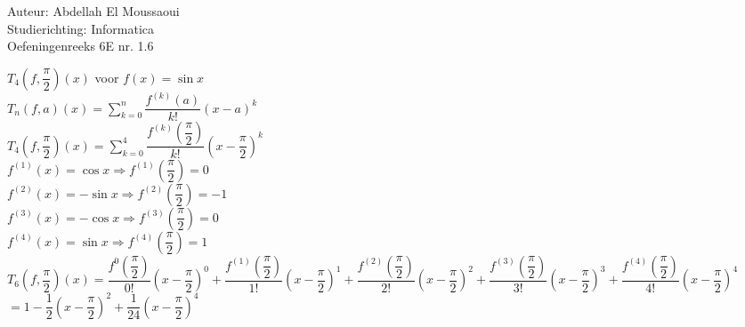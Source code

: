 \documentclass[a4paper]{article}
\begin{document}
  
\noindent \large Auteur: Abdellah El Moussaoui \\
\noindent \large Studierichting: Informatica\\
\noindent \large Oefeningenreeks 6E nr. 1.6\\

\medskip

\normalsize


$T_4\left(f,\dfrac{\pi}{2}\right)(x)$ voor $f(x) = \sin{x}$ \\

$T_n(f,a)(x) = \displaystyle\sum_{k = 0}^{n} \dfrac{f^{(k)}(a)}{k!}(x - a)^k$ \\

$T_4\left(f,\dfrac{\pi}{2}\right)(x) = \displaystyle\sum_{k = 0}^{4} \dfrac{f^{(k)}\left(\dfrac{\pi}{2}\right)}{k!}\left(x - \dfrac{\pi}{2}\right)^k$ \\

$f^{(1)}(x)= \cos x \Rightarrow f^{(1)}(\dfrac{\pi}{2})=0$\\

$f^{(2)}(x)= -\sin x \Rightarrow f^{(2)}(\dfrac{\pi}{2})=-1$\\

$f^{(3)}(x)= -\cos x \Rightarrow f^{(3)}(\dfrac{\pi}{2})=0$\\

$f^{(4)}(x)= \sin x \Rightarrow f^{(4)}(\dfrac{\pi}{2})=1$\\


$T_6\left(f,\dfrac{\pi}{2}\right)(x) = \dfrac{f^0\left(\dfrac{\pi}{2}\right)}{0!}\left(x-\dfrac{\pi}{2}\right)^0 + \dfrac{f^{(1)}\left(\dfrac{\pi}{2}\right)}{1!}\left(x-\dfrac{\pi}{2}\right)^1  + \dfrac{f^{(2)}\left(\dfrac{\pi}{2}\right)}{2!}\left(x-\dfrac{\pi}{2}\right)^2 + \dfrac{f^{(3)}\left(\dfrac{\pi}{2}\right)}{3!}\left(x-\dfrac{\pi}{2}\right)^3  + \dfrac{f^{(4)}\left(\dfrac{\pi}{2}\right)}{4!}\left(x-\dfrac{\pi}{2}\right)^4$ \\

$= 1 - \dfrac{1}{2}\left(x-\dfrac{\pi}{2}\right)^2+\dfrac{1}{24}\left(x-\dfrac{\pi}{2}\right)^4 $ \\


\begin{thebibliography}{999}
\end{thebibliography}
\end{document}
